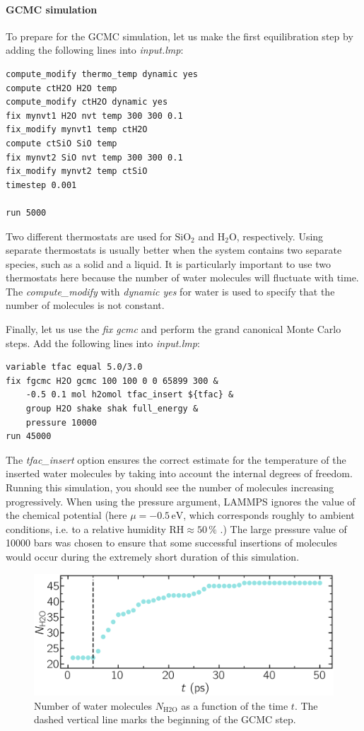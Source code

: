\documentclass[9pt,tutorial]{livecoms}
\begin{document}
\paragraph{GCMC simulation}
To prepare for the GCMC simulation, let us make the first equilibration step by
adding the following lines into \textit{input.lmp}:
{\normalsize \begin{verbatim}
compute_modify thermo_temp dynamic yes
compute ctH2O H2O temp
compute_modify ctH2O dynamic yes
fix mynvt1 H2O nvt temp 300 300 0.1
fix_modify mynvt1 temp ctH2O
compute ctSiO SiO temp
fix mynvt2 SiO nvt temp 300 300 0.1
fix_modify mynvt2 temp ctSiO
timestep 0.001

run 5000
\end{verbatim}}
Two different thermostats are used for $\text{SiO}_2$ and $\text{H}_2\text{O}$,
respectively. Using separate thermostats is usually better when the system contains
two separate species, such as a solid and a liquid. It is particularly important
to use two thermostats here because the number of water molecules will fluctuate
with time. The \textit{compute\_modify} with \textit{dynamic yes} for water is
used to specify that the number of molecules is not constant.

Finally, let us use the \textit{fix gcmc} and perform the grand canonical Monte
Carlo steps. Add the following lines into \textit{input.lmp}:
{\normalsize \begin{verbatim}
variable tfac equal 5.0/3.0
fix fgcmc H2O gcmc 100 100 0 0 65899 300 &
    -0.5 0.1 mol h2omol tfac_insert ${tfac} &
    group H2O shake shak full_energy &
    pressure 10000
run 45000
\end{verbatim}}
The \textit{tfac\_insert} option ensures the correct estimate for the temperature
of the inserted water molecules by taking into account the internal degrees of
freedom. Running this simulation, you should see the number of molecules increasing
progressively. When using the pressure argument, LAMMPS ignores the value of the
chemical potential (here $\mu = -0.5\,\text{eV}$, which corresponds roughly to
ambient conditions, i.e. to a relative humidity $\text{RH} \approx 50\,\%$ \cite{gravelle2020multi}.)
The large pressure value of 10000 bars was chosen to ensure that some successful
insertions of molecules would occur during the extremely short duration of this simulation.

\begin{figure}
\centering
\includegraphics[width=\linewidth]{GCMC-number}
\caption{Number of water molecules $N_\text{H2O}$ as a function of the time $t$.
The dashed vertical line marks the beginning of the GCMC step.}
\label{fig:GCMC-number}
\end{figure}
\end{document}

